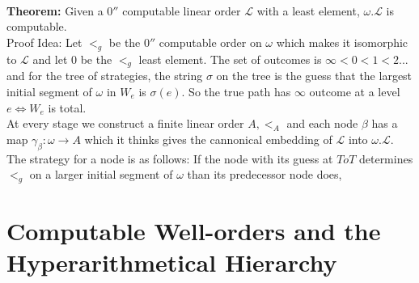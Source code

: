 \documentclass{article}
\begin{document}
	\\
	\textbf{Theorem:} Given a $0''$ computable linear order $\mathcal{L}$ with a least element, $\omega . \mathcal{L}$ is computable.\\
	Proof Idea: Let $<_g$ be the $0''$ computable order on $\omega$ which makes it isomorphic to $\mathcal{L}$ and let $0$ be the $<_g$ least element. The set of outcomes is $\infty < 0 < 1 < 2...$ and for the tree of strategies, the string $\sigma$ on the tree is the guess that the largest initial segment of $\omega$ in $W_e$ is $\sigma(e)$. So the true path has $\infty$ outcome at a level $e\iff W_e$ is total.\\
	At every stage we construct a finite linear order $A, <_A$ and each node $\beta$ has a map $\gamma_\beta: \omega \to A$ which it thinks gives the cannonical embedding of $\mathcal {L}$ into $\omega . \mathcal{L}$.\\
	The strategy for a node is as follows: If the node with its guess at $ToT$ determines $<_g$ on a larger initial segment of $\omega$ than its predecessor node does,
		\newpage
	
	\section{Computable Well-orders and the Hyperarithmetical Hierarchy}
	\newpage
\end{document}
